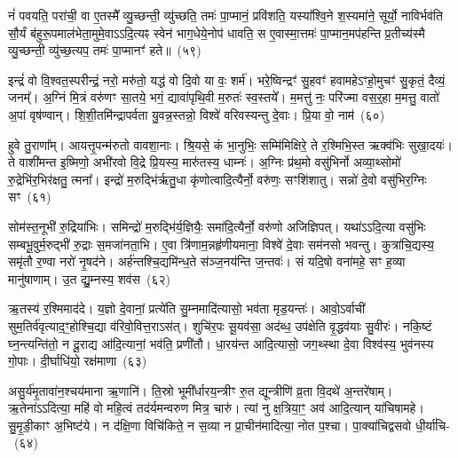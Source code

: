 नं॑ पवयति॒ परा॑ची॒ वा ए॒तस्मै᳚ व्यु॒च्छन्ती॒ व्यु॑च्छति॒ तमः॑ पा॒प्मानं॒ प्रवि॑शति॒ यस्या᳚श्वि॒ने श॒स्यमा॑ने॒ सूर्यो॒ नाविर्भव॑ति सौ॒र्यं ब॑हुरू॒पमाल॑भेता॒मुमे॒वा\-ऽऽ\-दि॒त्यꣴ स्वेन॑ भाग॒\-धेये॒नोप॑ धावति॒ स ए॒वास्मा॒त्तमः॑ पा॒प्मान॒मप॑हन्ति प्र॒तीच्य॑स्मै व्यु॒च्छन्ती॒ व्यु॑च्छ॒त्यप॒ तमः॑ पा॒प्मानꣳ॑ हते॥~(५९)\ip

{\anuvakamend[{ल॒लामः॒ स ए॒व षट्च॑त्वारिꣳशच्च}]}%

इन्द्रं॑ वो वि॒श्वत॒स्परीन्द्रं॒ नरो॒ मरु॑तो॒ यद्ध॑ वो दि॒वो या वः॒ शर्म॑। भरे॒ष्विन्द्रꣳ॑ सु॒हवꣳ॑ हवामहे\-ऽꣳहो॒मुचꣳ॑ सु॒कृतं॒ दैव्यं॒ जनम्᳚। अ॒ग्निं मि॒त्रं वरु॑णꣳ सा॒तये॒ भगं॒ द्यावा॑\-पृथि॒वी म॒रुतः॑ स्व॒स्तये᳚। म॒मत्तु॑ नः॒ परि॑ज्मा वस॒र्॒\mbox{}हा म॒मत्तु॒ वातो॑ अ॒पां वृष॑ण्वान्। शि॒शी॒तमि॑न्द्रापर्वता यु॒वन्न॒स्तन्नो॒ विश्वे॑ वरिवस्यन्तु दे॒वाः। प्रि॒या वो॒ नाम॑~(६०)\ip

हुवे तु॒राणा᳚म्। आयत्तृ॒पन्म॑रुतो वावशा॒नाः। श्रि॒यसे॒ कं भा॒नुभिः॒ सम्मि॑मिक्षिरे॒ ते र॒श्मिभि॒स्त ऋक्व॑भिः सुखा॒दयः॑। ते वाशी॑मन्त इ॒ष्मिणो॒ अभी॑रवो वि॒द्रे प्रि॒यस्य॒ मारु॑तस्य॒ धाम्नः॑। अ॒ग्निः प्र॑थ॒मो वसु॑भिर्नो अव्या॒थ्सोमो॑ रु॒द्रेभि॑र॒भिर॑क्षतु॒ त्मना᳚। इन्द्रो॑ म॒रुद्भि॑र्\mbox{}ऋतु॒धा कृ॑णोत्वादि॒त्यैर्नो॒ वरु॑णः॒ सꣳशि॑शातु। सन्नो॑ दे॒वो वसु॑भिर॒ग्निः सꣳ~(६१)\ip

सोम॑स्त॒नूभी॑ रु॒द्रिया॑भिः। समिन्द्रो॑ म॒रुद्भि॑र्य॒ज्ञियैः॒ समा॑दि॒त्यैर्नो॒ वरु॑णो अजिज्ञिपत्। यथा॑\-ऽऽ\-दि॒त्या वसु॑भिः सम्बभू॒वुर्म॒रुद्भी॑ रु॒द्राः स॒मजा॑नता॒भि। ए॒वा त्रि॑णाम॒न्नहृ॑णीयमाना॒ विश्वे॑ दे॒वाः सम॑नसो भवन्तु। कुत्रा॑चि॒द्यस्य॒ समृ॑तौ र॒ण्वा नरो॑ नृ॒षद॑ने। अर्\mbox{}ह॑न्तश्चि॒द्यमि॑न्ध॒ते स॑ञ्ज॒नय॑न्ति ज॒न्तवः॑। सं यदि॒षो वना॑महे॒ सꣳ ह॒व्या मानु॑षाणाम्। उ॒त द्यु॒म्नस्य॒ शव॑स~(६२)\ip

ऋ॒तस्य॑ र॒श्मिमाद॑दे। य॒ज्ञो दे॒वानां॒ प्रत्ये॑ति सु॒म्नमादि॑त्यासो॒ भव॑ता मृड॒यन्तः॑। आवो॒\-ऽर्वाची॑ सुम॒तिर्व॑वृत्या\-द॒ꣳ॒होश्चि॒द्या व॑रिवो॒वित्त॒रा\-ऽस॑त्। शुचि॑र॒पः सू॒यव॑सा॒ अद॑ब्ध॒ उप॑क्षेति वृ॒द्धव॑याः सु॒वीरः॑। नकि॒ष्टं घ्न॒न्त्यन्ति॑तो॒ न दू॒राद्य आ॑दि॒त्यानां॒ भव॑ति॒ प्रणी॑तौ। धा॒रय॑न्त आदि॒त्यासो॒ जग॒थ्स्था दे॒वा विश्व॑स्य॒ भुव॑नस्य गो॒पाः। दी॒र्घाधि॑यो॒ रक्ष॑माणा~(६३)\ip

असु॒र्य॑मृ॒तावा॑न॒श्चय॑माना ऋ॒णानि॑। ति॒स्रो भूमी᳚र्धारय॒न्त्रीꣳ रु॒त द्यून्त्रीणि॑ व्र॒ता वि॒दथे॑ अ॒न्तरे॑षाम्। ऋ॒तेना॑\-ऽऽ\-दित्या॒ महि॑ वो महि॒त्वं तद॑र्यमन्वरुण मित्र॒ चारु॑। त्यां नु क्ष॒त्रिया॒ꣳ॒ अव॑ आदि॒त्यान् या॑चिषामहे। सु॒मृ॒डी॒काꣳ अ॒भिष्ट॑ये। न द॑क्षि॒णा विचि॑किते॒ न स॒व्या न प्रा॒चीन॑मादित्या॒ नोत प॒श्चा। पा॒क्या॑चिद्वसवो धी॒र्या॑चि-~(६४)\ip

